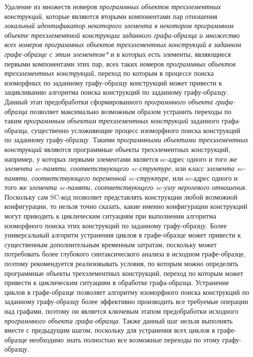 \begin{textitemize}
	\item Удаление из множеств номеров \textit{программных объектов трехэлементных конструкций}, которые являются вторыми компонентами пар отношения \textit{локальный идентификатор некоторого элемента в некотором программном объекте трехэлементной конструкции заданного графа-образца и множество всех номеров программных объектов трехэлементных конструкций в заданном графе-образце с этим элементом*} и в которых есть элементы, являющиеся первыми компонентами этих пар, всех таких номеров \textit{программных объектов трехэлементных конструкций}, переход по которым в процессе поиска изоморфных по заданному графу-образцу конструкций может привести к зацикливанию алгоритма поиска конструкций по заданному графу-образцу. Данный этап предобработки сформированного \textit{программного объекта графа-образца} позволяет максимально возможным образом устранить переходы по таким \textit{программным объектам трехэлементных конструкций} заданного графа-образца, существенно усложняющие процесс изоморфного поиска конструкций по заданному графу-образцу. Такими \textit{программными объектами трехэлементных конструкций} являются программные объекты трехэлементных конструкций, например, у которых первыми элементами является sc-адрес одного и того же \textit{элемента sc-памяти, соответствующего sc-структуре}, или \textit{класс элемента sc-памяти\scnsupergroupsign, соответствующего переменной sc-структуре}, или sc-адрес одного и того же \textit{элемента sc-памяти, соответствующего sc-узлу неролевого отношения}. Поскольку сам SC-код позволяет представлять конструкции любой возможной конфигурации, то нельзя точно сказать, какие именно конфигурации конструкций могут приводить к циклическим ситуациям при выполнении алгоритма изоморфного поиска этих конструкций по заданному графу-образцу. Более универсальный алгоритм устранения циклов в графе-образце может привести к существенным дополнительным временным затратам, поскольку может потребовать более глубокого синтаксического анализа в исходном графе-образце, поэтому рекомендуется реализовывать условия, по которым можно определять программные объекты трехэлементных конструкций, переход по которым может привести к циклическим ситуациям в обработке графа-образца. Устранение циклов в графе-образце позволяет алгоритму изоморфного поиска конструкций по заданному графу-образцу более эффективно производить все требуемые операции над графами, поэтому он является ключевым этапом предобработки исходного \textit{программного объекта графа-образца}. Также данный шаг нельзя выполнять вместе с предыдущим шагом, поскольку для устранения всех циклов в графе-образце необходимо знать полностью все возможные переходы по этому графу-образцу.

\end{textitemize}

